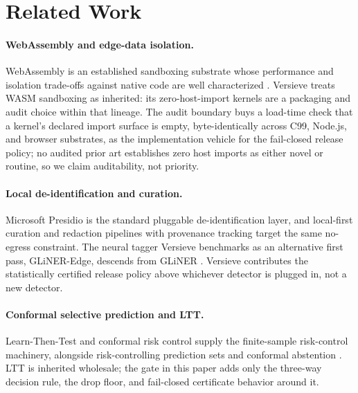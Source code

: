 \documentclass{article}
\begin{document}
\section{Related Work}
\label{sec:related}

\paragraph{WebAssembly and edge-data isolation.}
WebAssembly is an established sandboxing substrate \citep{haas2017wasm} whose performance and isolation trade-offs against native code are well characterized \citep{jangda2019notsofast}. Versieve treats WASM sandboxing as inherited: its zero-host-import kernels are a packaging and audit choice within that lineage. The audit boundary buys a load-time check that a kernel's declared import surface is empty, byte-identically across C99, Node.js, and browser substrates, as the implementation vehicle for the fail-closed release policy; no audited prior art establishes zero host imports as either novel or routine, so we claim auditability, not priority.

\paragraph{Local de-identification and curation.}
Microsoft Presidio \citep{presidio2021} is the standard pluggable de-identification layer, and local-first curation and redaction pipelines with provenance tracking \citep{bhattacharjee2026curatorkit,redakto2026incognito} target the same no-egress constraint. The neural tagger Versieve benchmarks as an alternative first pass, GLiNER-Edge, descends from GLiNER \citep{zaratiana2024gliner}. Versieve contributes the statistically certified release policy above whichever detector is plugged in, not a new detector.

\paragraph{Conformal selective prediction and LTT.}
Learn-Then-Test \citep{angelopoulos2021ltt} and conformal risk control \citep{angelopoulos2022crc} supply the finite-sample risk-control machinery, alongside risk-controlling prediction sets \citep{bates2021distributionfree} and conformal abstention \citep{abbasiyadkori2024abstention}. LTT is inherited wholesale; the gate in this paper adds only the three-way decision rule, the drop floor, and fail-closed certificate behavior around it.
\end{document}
